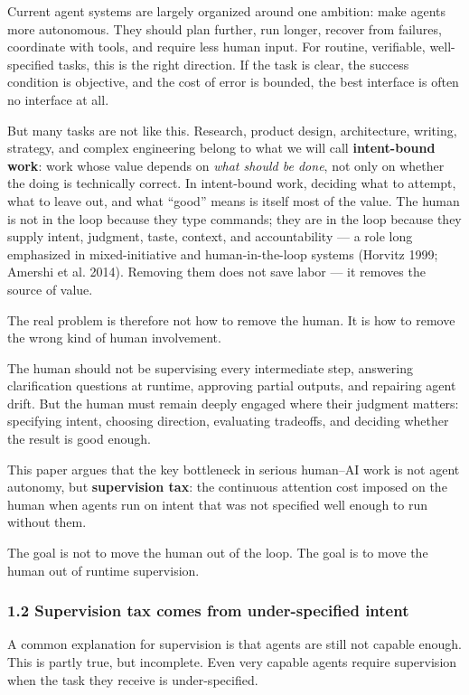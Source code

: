 \documentclass[
  nonatbib,
  preprint]{article}
\begin{document}
Current agent systems are largely organized around one ambition: make
agents more autonomous. They should plan further, run longer, recover
from failures, coordinate with tools, and require less human input. For
routine, verifiable, well-specified tasks, this is the right direction.
If the task is clear, the success condition is objective, and the cost
of error is bounded, the best interface is often no interface at all.

But many tasks are not like this. Research, product design,
architecture, writing, strategy, and complex engineering belong to what
we will call \textbf{intent-bound work}: work whose value depends on
\emph{what should be done}, not only on whether the doing is technically
correct. In intent-bound work, deciding what to attempt, what to leave
out, and what ``good'' means is itself most of the value. The human is
not in the loop because they type commands; they are in the loop because
they supply intent, judgment, taste, context, and accountability --- a
role long emphasized in mixed-initiative and human-in-the-loop systems
(Horvitz 1999; Amershi et al. 2014). Removing them does not save labor
--- it removes the source of value.

The real problem is therefore not how to remove the human. It is how to
remove the wrong kind of human involvement.

The human should not be supervising every intermediate step, answering
clarification questions at runtime, approving partial outputs, and
repairing agent drift. But the human must remain deeply engaged where
their judgment matters: specifying intent, choosing direction,
evaluating tradeoffs, and deciding whether the result is good enough.

This paper argues that the key bottleneck in serious human--AI work is
not agent autonomy, but \textbf{supervision tax}: the continuous
attention cost imposed on the human when agents run on intent that was
not specified well enough to run without them.

The goal is not to move the human out of the loop. The goal is to move
the human out of runtime supervision.

\subsubsection{1.2 Supervision tax comes from under-specified
intent}\label{supervision-tax-comes-from-under-specified-intent}

A common explanation for supervision is that agents are still not
capable enough. This is partly true, but incomplete. Even very capable
agents require supervision when the task they receive is
under-specified.
\end{document}
